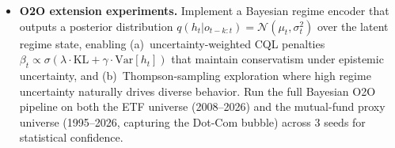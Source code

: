 \begin{itemize}[noitemsep, topsep=0pt]
\item \textbf{O2O extension experiments.}
      Implement a Bayesian regime encoder that outputs a posterior
      distribution $q(h_t | o_{t-k:t}) = \mathcal{N}(\mu_t, \sigma_t^2)$
      over the latent regime state, enabling (a)~uncertainty-weighted CQL
      penalties $\beta_t \propto \sigma(\lambda \cdot \mathrm{KL} +
      \gamma \cdot \mathrm{Var}[h_t])$ that maintain conservatism under
      epistemic uncertainty, and (b)~Thompson-sampling exploration where
      high regime uncertainty naturally drives diverse behavior.  Run the
      full Bayesian O2O pipeline on both the ETF universe (2008--2026)
      and the mutual-fund proxy universe (1995--2026, capturing the
      Dot-Com bubble) across 3 seeds for statistical confidence.
\end{itemize}




